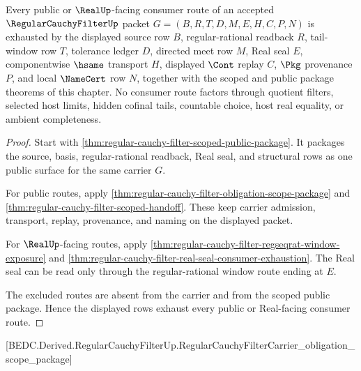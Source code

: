 \begin{theorem}
\label{thm:regular-cauchy-filter-mature-route-exhaustion}
Every public or $\RealUp$-facing consumer route of an accepted $\RegularCauchyFilterUp$ packet $G=(B,R,T,D,M,E,H,C,P,N)$ is exhausted by the displayed source row $B$, regular-rational readback $R$, tail-window row $T$, tolerance ledger $D$, directed meet row $M$, Real seal $E$, componentwise $\hsame$ transport $H$, displayed $\Cont$ replay $C$, $\Pkg$ provenance $P$, and local $\NameCert$ row $N$, together with the scoped and public package theorems of this chapter. No consumer route factors through quotient filters, selected host limits, hidden cofinal tails, countable choice, host real equality, or ambient completeness.
\end{theorem}
\begin{proof}
Start with \autoref{thm:regular-cauchy-filter-scoped-public-package}. It packages the source, basis, regular-rational readback, Real seal, and structural rows as one public surface for the same carrier $G$.

For public routes, apply \autoref{thm:regular-cauchy-filter-obligation-scope-package} and \autoref{thm:regular-cauchy-filter-scoped-handoff}. These keep carrier admission, transport, replay, provenance, and naming on the displayed packet.

For $\RealUp$-facing routes, apply \autoref{thm:regular-cauchy-filter-regseqrat-window-exposure} and \autoref{thm:regular-cauchy-filter-real-seal-consumer-exhaustion}. The Real seal can be read only through the regular-rational window route ending at $E$.

The excluded routes are absent from the carrier and from the scoped public package. Hence the displayed rows exhaust every public or Real-facing consumer route.
\end{proof}

[BEDC.Derived.RegularCauchyFilterUp.RegularCauchyFilterCarrier\_obligation\_scope\_package]

